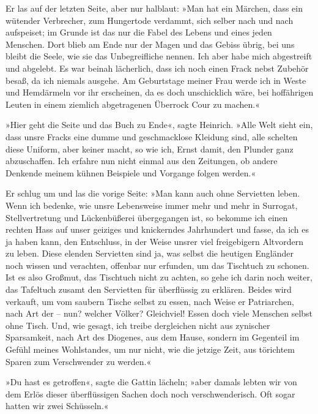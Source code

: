 Er las auf der letzten Seite, aber nur halblaut: »Man hat ein Märchen, dass ein wütender Verbrecher, zum Hungertode verdammt, sich selber nach und nach aufspeiset; im Grunde ist das nur die Fabel des Lebens und eines jeden Menschen. Dort blieb am Ende nur der Magen und das Gebiss übrig, bei uns bleibt die Seele, wie sie das Unbegreifliche nennen. Ich aber habe mich abgestreift und abgelebt. Es war beinah lächerlich, dass ich noch einen Frack nebst Zubehör besaß, da ich niemals ausgehe. Am Geburtstage meiner Frau werde ich in Weste und Hemdärmeln vor ihr erscheinen, da es doch unschicklich wäre, bei hoffährigen Leuten in einem ziemlich abgetragenen Überrock Cour zu machen.«

»Hier geht die Seite und das Buch zu Ende«, sagte Heinrich. »Alle Welt sieht ein, dass unsre Fracks eine dumme und geschmacklose Kleidung sind, alle schelten diese Uniform, aber keiner macht, so wie ich, Ernst damit, den Plunder ganz abzuschaffen. Ich erfahre nun nicht einmal aus den Zeitungen, ob andere Denkende meinem kühnen Beispiele und Vorgange folgen werden.«

Er schlug um und las die vorige Seite: »Man kann auch ohne Servietten leben. Wenn ich bedenke, wie unsre Lebensweise immer mehr und mehr in Surrogat, Stellvertretung und Lückenbüßerei übergegangen ist, so bekomme ich einen rechten Hass auf unser geiziges und knickerndes Jahrhundert und fasse, da ich es ja haben kann, den Entschluss, in der Weise unsrer viel freigebigern Altvordern zu leben. Diese elenden Servietten sind ja, was selbst die heutigen Engländer noch wissen und verachten, offenbar nur erfunden, um das Tischtuch zu schonen. Ist es also Großmut, das Tischtuch nicht zu achten, so gehe ich darin noch weiter, das Tafeltuch zusamt den Servietten für überflüssig zu erklären. Beides wird verkauft, um vom saubern Tische selbst zu essen, nach Weise er Patriarchen, nach Art der – nun? welcher Völker? Gleichviel! Essen doch viele Menschen selbst ohne Tisch. Und, wie gesagt, ich treibe dergleichen nicht aus zynischer Sparsamkeit, nach Art des Diogenes, aus dem Hause, sondern im Gegenteil im Gefühl meines Wohlstandes, um nur nicht, wie die jetzige Zeit, aus törichtem Sparen zum Verschwender zu werden.«

»Du hast es getroffen«, sagte die Gattin lächeln; »aber damals lebten wir von dem Erlös dieser überflüssigen Sachen doch noch verschwenderisch. Oft sogar hatten wir zwei Schüsseln.«

